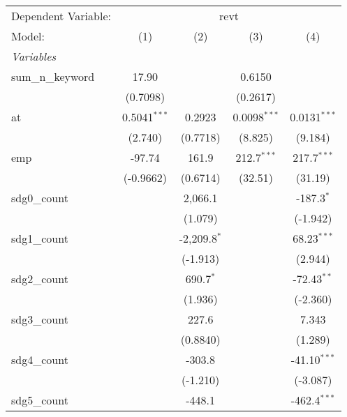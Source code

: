 
\begingroup
\centering
\begin{tabular}{lcccc}
   \tabularnewline \midrule \midrule
   Dependent Variable: & \multicolumn{4}{c}{revt}\\
   Model:            & (1)            & (2)            & (3)            & (4)\\  
   \midrule
   \emph{Variables}\\
   sum\_n\_keyword   & 17.90          &                & 0.6150         &   \\   
                     & (0.7098)       &                & (0.2617)       &   \\   
   at                & 0.5041$^{***}$ & 0.2923         & 0.0098$^{***}$ & 0.0131$^{***}$\\   
                     & (2.740)        & (0.7718)       & (8.825)        & (9.184)\\   
   emp               & -97.74         & 161.9          & 212.7$^{***}$  & 217.7$^{***}$\\   
                     & (-0.9662)      & (0.6714)       & (32.51)        & (31.19)\\   
   sdg0\_count       &                & 2,066.1        &                & -187.3$^{*}$\\   
                     &                & (1.079)        &                & (-1.942)\\   
   sdg1\_count       &                & -2,209.8$^{*}$ &                & 68.23$^{***}$\\   
                     &                & (-1.913)       &                & (2.944)\\   
   sdg2\_count       &                & 690.7$^{*}$    &                & -72.43$^{**}$\\   
                     &                & (1.936)        &                & (-2.360)\\   
   sdg3\_count       &                & 227.6          &                & 7.343\\   
                     &                & (0.8840)       &                & (1.289)\\   
   sdg4\_count       &                & -303.8         &                & -41.10$^{***}$\\   
                     &                & (-1.210)       &                & (-3.087)\\   
   sdg5\_count       &                & -448.1         &                & -462.4$^{***}$\\   

\end{tabular}
